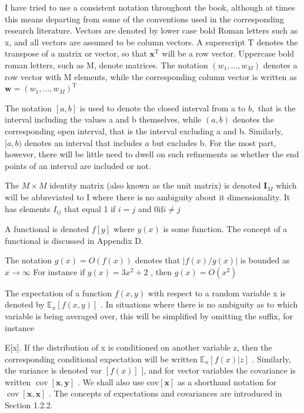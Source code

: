 \documentclass[
  10
]{article}
\begin{document}
I have tried to use a consistent notation throughout the book, although
at times this means departing from some of the conventions used in the
corresponding research literature. Vectors are denoted by lower case
bold Roman letters such as x, and all vectors are assumed to be column
vectors. A superscript T denotes the transpose of a matrix or vector, so
that \(\mathbf { x } ^ { \mathrm { { T } } }\) will be a row vector.
Uppercase bold roman letters, such as M, denote matrices. The notation
\(( w _ { 1 } , \ldots , w _ { M } )\) denotes a row vector with M
elements, while the corresponding column vector is written as
\(\mathbf { w } = ( w _ { 1 } , \hdots , w _ { M } ) ^ { \mathrm { T } }\)

The notation \([ a , b ]\) is used to denote the closed interval from a
to \(b ,\) that is the interval including the values a and b themselves,
while \(( a , b )\) denotes the corresponding open interval, that is the
interval excluding a and b. Similarly, \([ a , b )\) denotes an interval
that includes \(a\) but excludes b. For the most part, however, there
will be little need to dwell on such refinements as whether the end
points of an interval are included or not.

The \(M \times M\) identity matrix (also known as the unit matrix) is
denoted \({ \mathbf { I } } _ { M }\) which will be abbreviated to I
where there is no ambiguity about it dimensionality. It has elements
\(I _ { i j }\) that equal 1 if \(i = j\) and
\(0 \mathrm { i f } i \neq j\)

A functional is denoted \(f [ y ]\) where \(y ( x )\) is some function.
The concept of a functional is discussed in Appendix D.

The notation \(g ( x ) = O ( f ( x ) )\) denotes that
\(| f ( x ) / g ( x ) |\) is bounded as \(x \to \infty\) For instance if
\(g ( x ) = 3 x ^ { 2 } + 2\) , then \(g ( x ) = O ( x ^ { 2 } )\)

The expectation of a function \(f ( x , y )\) with respect to a random
variable x is denoted by \(\mathbb { E } _ { x } [ f ( x , y ) ]\) . In
situations where there is no ambiguity as to which variable is being
averaged over, this will be simplified by omitting the suffix, for
instance

E{[}x{]}. If the distribution of x is conditioned on another variable z,
then the corresponding conditional expectation will be written
\(\mathbb { E } _ { x } [ f ( x ) | z ]\) . Similarly, the variance is
denoted var \([ f ( x ) ]\) {]}, and for vector variables the covariance
is written \(\operatorname { c o v } [ \mathbf { x } , \mathbf { y } ]\)
. We shall also use \(\mathrm { c o v } [ \mathbf { x } ]\) as a
shorthand notation for
\(\operatorname { c o v } [ \mathbf { x } , \mathbf { x } ]\) . The
concepts of expectations and covariances are introduced in Section
1.2.2.
\end{document}
